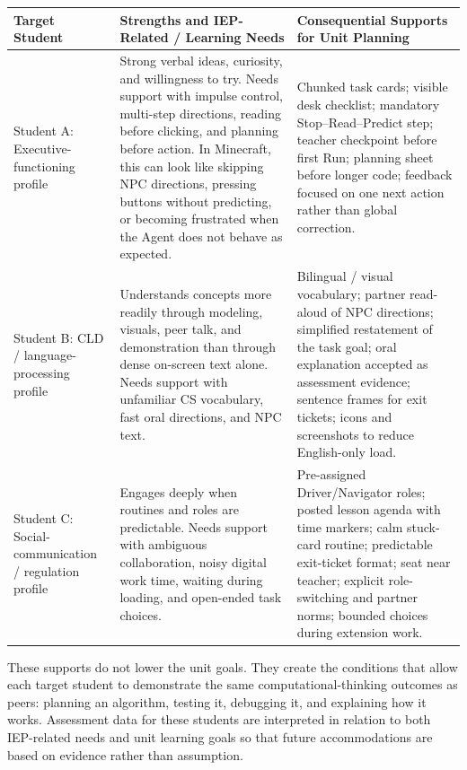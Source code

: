 \documentclass[12pt]{article}
\newcommand{\arow}{\rowcolor{altRow}}
\begin{document}
\begin{tabularx}{\textwidth}{|P{1.55in}|P{2.45in}|L|}
\hline
{}\color{white}\bfseries Target Student & \color{white}\bfseries Strengths and IEP-Related / Learning Needs & \color{white}\bfseries Consequential Supports for Unit Planning \\
\hline
Student A: Executive-functioning profile & Strong verbal ideas, curiosity, and willingness to try. Needs support with impulse control, multi-step directions, reading before clicking, and planning before action. In Minecraft, this can look like skipping NPC directions, pressing buttons without predicting, or becoming frustrated when the Agent does not behave as expected. & Chunked task cards; visible desk checklist; mandatory Stop--Read--Predict step; teacher checkpoint before first Run; planning sheet before longer code; feedback focused on one next action rather than global correction. \\
\hline
\arow Student B: CLD / language-processing profile & Understands concepts more readily through modeling, visuals, peer talk, and demonstration than through dense on-screen text alone. Needs support with unfamiliar CS vocabulary, fast oral directions, and NPC text. & Bilingual / visual vocabulary; partner read-aloud of NPC directions; simplified restatement of the task goal; oral explanation accepted as assessment evidence; sentence frames for exit tickets; icons and screenshots to reduce English-only load. \\
\hline
Student C: Social-communication / regulation profile & Engages deeply when routines and roles are predictable. Needs support with ambiguous collaboration, noisy digital work time, waiting during loading, and open-ended task choices. & Pre-assigned Driver/Navigator roles; posted lesson agenda with time markers; calm stuck-card routine; predictable exit-ticket format; seat near teacher; explicit role-switching and partner norms; bounded choices during extension work. \\
\hline
\end{tabularx}

These supports do not lower the unit goals. They create the conditions that allow each target student to demonstrate the same computational-thinking outcomes as peers: planning an algorithm, testing it, debugging it, and explaining how it works. Assessment data for these students are interpreted in relation to both IEP-related needs and unit learning goals so that future accommodations are based on evidence rather than assumption.
\end{document}
